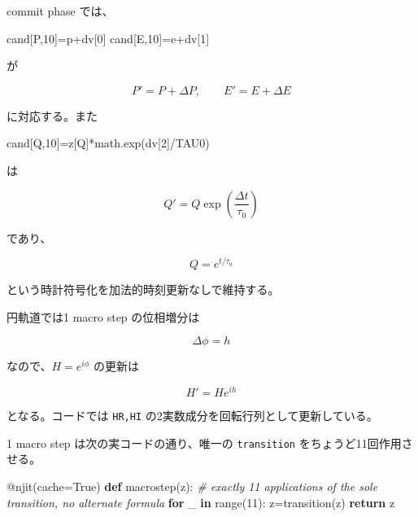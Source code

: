\documentclass[
  a4paper,
]{ltjsarticle}
\newenvironment{Shaded}{}{}
\newcommand{\AttributeTok}[1]{\textcolor[rgb]{0.49,0.56,0.16}{#1}}
\newcommand{\BuiltInTok}[1]{\textcolor[rgb]{0.00,0.50,0.00}{#1}}
\newcommand{\CommentTok}[1]{\textcolor[rgb]{0.38,0.63,0.69}{\textit{#1}}}
\newcommand{\ControlFlowTok}[1]{\textcolor[rgb]{0.00,0.44,0.13}{\textbf{#1}}}
\newcommand{\DecValTok}[1]{\textcolor[rgb]{0.25,0.63,0.44}{#1}}
\newcommand{\KeywordTok}[1]{\textcolor[rgb]{0.00,0.44,0.13}{\textbf{#1}}}
\newcommand{\NormalTok}[1]{#1}
\newcommand{\OperatorTok}[1]{\textcolor[rgb]{0.40,0.40,0.40}{#1}}
\newcommand{\VariableTok}[1]{\textcolor[rgb]{0.10,0.09,0.49}{#1}}
\begin{document}
commit phase では、

\begin{Shaded}
\begin{Highlighting}[]
\NormalTok{cand[P,}\DecValTok{10}\NormalTok{]}\OperatorTok{=}\NormalTok{p}\OperatorTok{+}\NormalTok{dv[}\DecValTok{0}\NormalTok{]}
\NormalTok{cand[E,}\DecValTok{10}\NormalTok{]}\OperatorTok{=}\NormalTok{e}\OperatorTok{+}\NormalTok{dv[}\DecValTok{1}\NormalTok{]}
\end{Highlighting}
\end{Shaded}

が

\[
P'=P+\Delta P,
\qquad
E'=E+\Delta E
\]

に対応する。また

\begin{Shaded}
\begin{Highlighting}[]
\NormalTok{cand[Q,}\DecValTok{10}\NormalTok{]}\OperatorTok{=}\NormalTok{z[Q]}\OperatorTok{*}\NormalTok{math.exp(dv[}\DecValTok{2}\NormalTok{]}\OperatorTok{/}\NormalTok{TAU0)}
\end{Highlighting}
\end{Shaded}

は

\[
Q'=Q\exp\left(\frac{\Delta t}{\tau_0}\right)
\]

であり、

\[
Q=e^{t/\tau_0}
\]

という時計符号化を加法的時刻更新なしで維持する。

円軌道では1 macro step の位相増分は

\[
\Delta\phi=h
\]

なので、\(H=e^{i\phi}\) の更新は

\[
H'=He^{ih}
\]

となる。コードでは \texttt{HR,HI}
の2実数成分を回転行列として更新している。

1 macro step は次の実コードの通り、唯一の \texttt{transition}
をちょうど11回作用させる。

\begin{Shaded}
\begin{Highlighting}[]
\AttributeTok{@njit}\NormalTok{(cache}\OperatorTok{=}\VariableTok{True}\NormalTok{)}
\KeywordTok{def}\NormalTok{ macrostep(z):}
    \CommentTok{\# exactly 11 applications of the sole transition, no alternate formula}
    \ControlFlowTok{for}\NormalTok{ \_ }\KeywordTok{in} \BuiltInTok{range}\NormalTok{(}\DecValTok{11}\NormalTok{): z}\OperatorTok{=}\NormalTok{transition(z)}
    \ControlFlowTok{return}\NormalTok{ z}
\end{Highlighting}
\end{Shaded}
\end{document}
